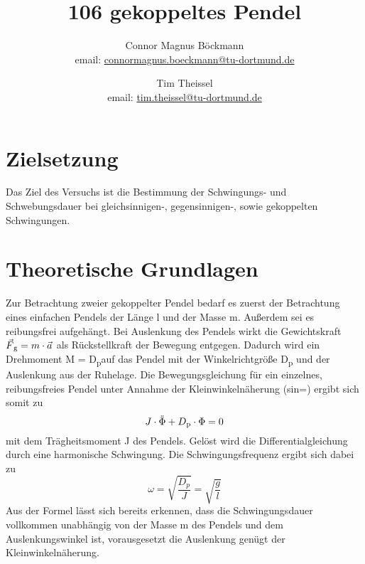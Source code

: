 \documentclass[titlepage=firstcover, captions=tableheading]{scrartcl}
\title{106 gekoppeltes Pendel}
\author{
Connor Magnus Böckmann \\ email: \href{mailto:connormagnus.boeckmann@tu-dortmund.de}{connormagnus.boeckmann@tu-dortmund.de}
\and Tim Theissel \\ email: \href{mailto:tim.theissel@tu-dortmund.de}{tim.theissel@tu-dortmund.de}  
}
\begin{document}
\maketitle
\newpage
\tableofcontents
\newpage
\section{Zielsetzung}
Das Ziel des Versuchs ist die Bestimmung der Schwingungs- und Schwebungsdauer bei gleichsinnigen-, gegensinnigen-, sowie gekoppelten Schwingungen.
\section{Theoretische Grundlagen}
Zur Betrachtung zweier gekoppelter Pendel bedarf es zuerst der Betrachtung eines einfachen Pendels der Länge l und der Masse m. Außerdem sei es reibungsfrei aufgehängt. Bei Auslenkung des Pendels wirkt die Gewichtskraft $\vec{F}\textsubscript{g} = m\cdot\vec{a}$ als Rückstellkraft der Bewegung entgegen. Dadurch wird ein Drehmoment M = D\textsubscript{p}\cdot\Phi  auf das Pendel mit der Winkelrichtgröße D\textsubscript{p} und der Auslenkung \Phi   aus der Ruhelage. Die Bewegungsgleichung für ein einzelnes, reibungsfreies Pendel unter Annahme der Kleinwinkelnäherung (sin\theta=\theta) ergibt sich somit zu 
\begin{displaymath}
    J\cdot\ddot{\Phi}+D\textsubscript{p}\cdot\Phi=0
\end{displaymath}
mit dem Trägheitsmoment J des Pendels. Gelöst wird die Differentialgleichung durch eine harmonische Schwingung. Die Schwingungsfrequenz ergibt sich dabei zu  
\begin{displaymath}
    \omega=\sqrt{\frac{D_p}{J}}=\sqrt{\frac{g}{l}}
\end{displaymath}
Aus der Formel lässt sich bereits erkennen, dass die Schwingungsdauer vollkommen unabhängig von der Masse m des Pendels und dem Auslenkungswinkel \Phi ist, vorausgesetzt die Auslenkung genügt der Kleinwinkelnäherung.
\end{document}

